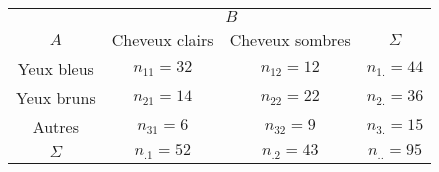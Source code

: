 \documentclass{standalone}
\begin{document}
\begin{tabular}{c|cc|c}
	\hline
	&\multicolumn{2}{c}{$B$}\\
	\cline{2-3}
	$A$ & Cheveux clairs & Cheveux sombres & $\Sigma$\\
	\hline Yeux bleus & $n_{11}= 32$
	& $n_{12}= 12$ & $n_{1.} = 44$\\ Yeux bruns & $n_{21}= 14$ &
	$n_{22}= 22$ & $n_{2.}=36$\\ Autres & $n_{31}= 6$ & $n_{32}=
	9$ & $n_{3.}=15$\\\hline $ \Sigma$ & $n_{.1} = 52$ & $n_{.2} = 43$
	& $n_{..}=95$\\
\end{tabular}
\end{document}
